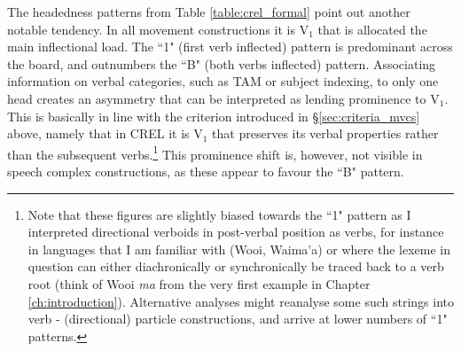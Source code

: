 The headedness patterns from Table \ref{table:crel_formal} point out another notable tendency. In all movement constructions it is V$_1$ that is allocated the main inflectional load. The ``1" (first verb inflected) pattern is predominant across the board, and outnumbers the ``B" (both verbs inflected) pattern. Associating information on verbal categories, such as TAM or subject indexing, to only one head creates an asymmetry that can be interpreted as lending prominence to V$_1$. This is basically in line with the criterion introduced in §\ref{sec:criteria_mvcs} above, namely that in CREL it is V$_1$ that preserves its verbal properties rather than the subsequent verbs.\footnote{Note that these figures are slightly biased towards the ``1" pattern as I interpreted directional verboids in post-verbal position as verbs, for instance in languages that I am familiar with (Wooi, Waima'a) or where the lexeme in question can either diachronically or synchronically be traced back to a verb root (think of Wooi \textit{ma} from the very first example in Chapter \ref{ch:introduction}). Alternative analyses might reanalyse some such strings into verb - (directional) particle constructions, and arrive at lower numbers of ``1" patterns.} This prominence shift is, however, not visible in speech complex constructions, as these appear to favour the ``B" pattern.

